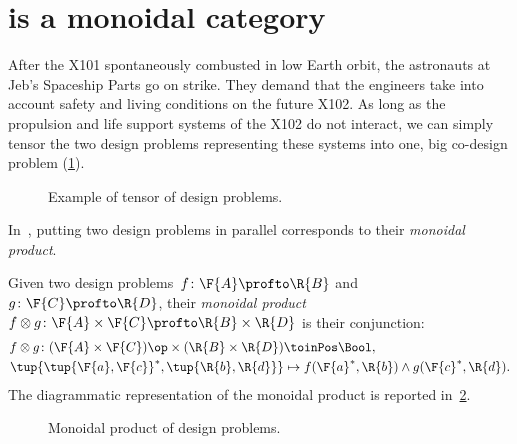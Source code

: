 

\section{\DP is a monoidal category}\label{sec:parallelism-DP-monoidal}
\begin{example}
  After the X101 spontaneously combusted in low Earth orbit, the astronauts at Jeb's Spaceship Parts go on strike. They demand that the engineers take into account safety and living conditions on the future X102. As long as the propulsion and life support systems of the X102 do not interact, we can simply tensor the two design problems representing these systems into one, big co-design problem (\cref{fig:examplemonoidal}).
  \begin{figure}[h!]
    \begin{center}
    \end{center}
    \caption{Example of tensor of design problems. \label{fig:examplemonoidal}}
  \end{figure}
\end{example}
In~\DP, putting two design problems in parallel corresponds to their \emph{monoidal product}.

\begin{definition}
  \label{def:monoidalproduct}
  Given two design problems~$f \colon \F{A} \profto \R{B}$ and~$g \colon \F{C} \profto \R{D}$, their \emph{monoidal product}~$f\otimes g \colon \F{A} \times \F{C} \profto \R{B} \times \R{D}$ is their conjunction:
  \begin{equation}
    \begin{aligned}
      f \otimes g \colon (\F{A} \times \F{C})\op \times (\R{B} \times \R{D}) & \toinPos \Bool, \\
      \tup{\tup{\F{a},\F{c}}^*,\tup{\R{b},\R{d}}} &\mapsto f(\F{a}^*,\R{b}) \wedge g(\F{c}^*,\R{d}).
    \end{aligned}
  \end{equation}
  The diagrammatic representation of the monoidal product is reported in~\cref{fig:dpmonoidal}.
\end{definition}

\begin{figure}[h!]
  \begin{center}
  \end{center}
  \caption{Monoidal product of design problems. \label{fig:dpmonoidal}}
\end{figure}


